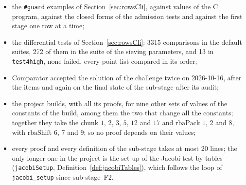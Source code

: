 \begin{itemize}
    that compute them; the include of the private header and the instrumentation of
    \verb|find_points.c| excluded; the prime that says nothing and the prime beyond the loop of the
    tables told apart in the deviation of the tables of rows; the comments of the \verb|#guard|
    examples made to say what the examples test, and the examples of the builders checked against
    the closed form on one period of the words and by that period; the orphans deleted and the
    helpers used once private; the abbreviated names of the invariants spelled out
    (\verb|RepeatedBits|, \verb|UnitPatternInvariant|, \verb|NonunitPatternInvariant|) and the two
    lemmas on the patterns of the layout named after their patterns
    (\verb|sieveInitPower_pre_layOut_unit| and \verb|sieveInitPower_pre_layOut_nonunit|, the second
    primed before); the general facts in their natural generality in
    \verb|Ratpoints/Proof/Containers.lean| and \verb|Ratpoints/Proof/Bits.lean|; the growth of the
    store a structure with named fields; the records of comparator; and the bound of a row by its
    modulus a lemma (\verb|Nat.le_add_sub_one_mul|) in place of the same proof at four sites; the
    uses recorded in the nodes were checked against the dependencies of the Lean code;
  \item the \verb|#guard| examples of Section~\ref{sec:rowsCli}, against values of the C program,
    against the closed forms of the admission tests and against the first stage one row at a time;
  \item the differential tests of Section~\ref{sec:rowsCli}: 3315 comparisons in the default
    suites, 272 of them in the suite of the sieving parameters, and 13 in \verb|test4high|, none
    failed, every point list compared in its order;
  \item Comparator accepted the solution of the challenge twice on 2026-10-16, after the items and
    again on the final state of the sub-stage after its audit;
  \item the project builds, with all its proofs, for nine other sets of values of the constants of
    the build, among them the two that change all the constants; together they take the chunk $1$,
    $2$, $3$, $5$, $12$ and $17$ and $\mathrm{rbaPack}$ $1$, $2$ and $8$, with $\mathrm{rbaShift}$
    $6$, $7$ and $9$; so no proof depends on their values;
  \item every proof and every definition of the sub-stage takes at most 20 lines; the only longer
    one in the project is the set-up of the Jacobi test by tables (\verb|jacobiSetup|,
    Definition~\ref{def:jacobiTables}), which follows the loop of \verb|jacobi_setup| since
    sub-stage~F2.
\end{itemize}
